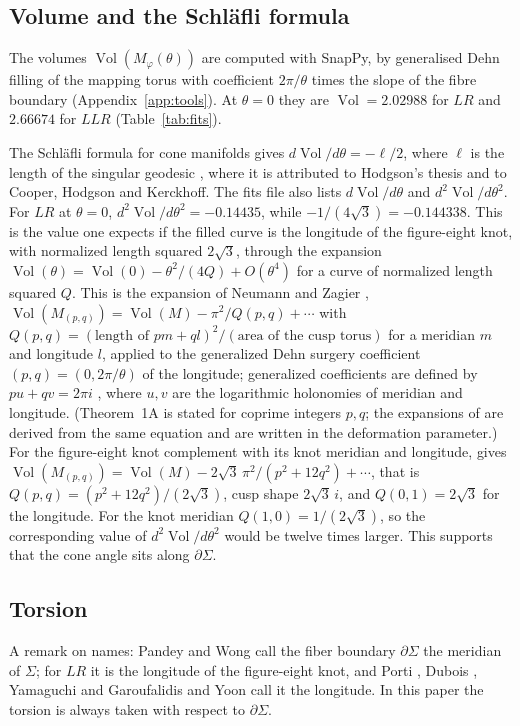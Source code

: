\documentclass[11pt]{amsart}
\theoremstyle{definition}
\theoremstyle{remark}
\newcommand{\Vol}{\operatorname{Vol}}
\begin{document}
\subsection{Volume and the Schl\"afli formula}
The volumes $\Vol(M_\varphi(\theta))$ are computed with SnapPy, by generalised Dehn
filling of the mapping torus with coefficient $2\pi/\theta$ times the slope of the
fibre boundary (Appendix~\ref{app:tools}). At $\theta = 0$ they are
$\Vol = 2.02988$ for $LR$ and $2.66674$ for $LLR$ (Table~\ref{tab:fits}).

The Schl\"afli formula for cone manifolds gives $d\Vol/d\theta = -\ell/2$, where
$\ell$ is the length of the singular geodesic \cite[equation~(23) and
Remark~2.8]{HK}, where it is attributed to Hodgson's thesis and
to Cooper, Hodgson and Kerckhoff. The fits file also lists
$d\Vol/d\theta$ and $d^2\Vol/d\theta^2$. For $LR$ at $\theta = 0$,
$d^2\Vol/d\theta^2 = -0.14435$, while $-1/(4\sqrt3) = -0.144338$. This is the
value one expects if the filled curve is the longitude of the figure-eight knot, with
normalized length squared $2\sqrt3$, through the expansion
$\Vol(\theta) = \Vol(0) - \theta^2/(4Q) + O(\theta^4)$ for a curve of normalized
length squared $Q$. This is the expansion of Neumann and Zagier \cite[Theorem~1A]{NZ},
$\Vol(M_{(p,q)}) = \Vol(M) - \pi^2/Q(p,q) + \cdots$ with
$Q(p,q) = (\text{length of } pm + ql)^2/(\text{area of the cusp torus})$ for a
meridian $m$ and longitude $l$, applied
to the generalized Dehn surgery coefficient $(p,q) = (0, 2\pi/\theta)$ of the
longitude; generalized coefficients are defined by $pu + qv = 2\pi i$
\cite[Section~4, (32)]{NZ}, where $u, v$ are the logarithmic holonomies of meridian
and longitude. (Theorem~1A is stated for coprime integers $p, q$; the expansions of
\cite[Section~6]{NZ} are derived from the same equation and are written in the
deformation parameter.) For the figure-eight knot complement with its knot meridian and
longitude, \cite[Section~6, p.~331]{NZ} gives
$\Vol(M_{(p,q)}) = \Vol(M) - 2\sqrt3\,\pi^2/(p^2 + 12q^2) + \cdots$, that is
$Q(p,q) = (p^2+12q^2)/(2\sqrt3)$, cusp shape $2\sqrt3\,i$, and $Q(0,1) = 2\sqrt3$ for
the longitude. For the knot meridian $Q(1,0) = 1/(2\sqrt3)$, so the corresponding
value of $d^2\Vol/d\theta^2$ would be twelve times larger. This supports that the cone angle sits
along $\partial\Sigma$.

\subsection{Torsion}\label{sec:torsion}
A remark on names: Pandey and Wong \cite{PW} call the fiber boundary $\partial\Sigma$
the meridian of $\Sigma$; for $LR$ it is the longitude of the figure-eight knot, and
Porti \cite{Porti}, Dubois \cite{Dub}, Yamaguchi \cite{Yam} and Garoufalidis and Yoon
\cite{GY21} call it the longitude. In this paper the torsion is always taken with
respect to $\partial\Sigma$.
\end{document}
